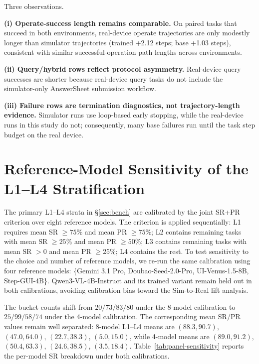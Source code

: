 Three observations.

\textbf{(i) Operate-success length remains comparable.} On paired tasks that succeed in both environments, real-device operate trajectories are only modestly longer than simulator trajectories (trained +2.12 steps; base +1.03 steps), consistent with similar successful-operation path lengths across environments.

\textbf{(ii) Query/hybrid rows reflect protocol asymmetry.} Real-device query successes are shorter because real-device query tasks do not include the simulator-only AnswerSheet submission workflow.

\textbf{(iii) Failure rows are termination diagnostics, not trajectory-length evidence.} Simulator runs use loop-based early stopping, while the real-device runs in this study do not; consequently, many base failures run until the task step budget on the real device.


\section{Reference-Model Sensitivity of the L1--L4 Stratification}\label{app:panel-sensitivity}

The primary L1--L4 strata in §\ref{sec:bench} are calibrated by the joint SR+PR criterion over eight reference models. The criterion is applied sequentially: L1 requires mean SR $\geq75\%$ and mean PR $\geq75\%$; L2 contains remaining tasks with mean SR $\geq25\%$ and mean PR $\geq50\%$; L3 contains remaining tasks with mean SR $>0$ and mean PR $\geq25\%$; L4 contains the rest. To test sensitivity to the choice and number of reference models, we re-run the same calibration using four reference models: \{Gemini 3.1 Pro, Doubao-Seed-2.0-Pro, UI-Venus-1.5-8B, Step-GUI-4B\}. Qwen3-VL-4B-Instruct and its trained variant remain held out in both calibrations, avoiding calibration bias toward the Sim-to-Real lift analysis.

The bucket counts shift from $20/73/83/80$ under the 8-model calibration to $25/99/58/74$ under the 4-model calibration. The corresponding mean SR/PR values remain well separated: 8-model L1--L4 means are $(88.3,90.7)$, $(47.0,64.0)$, $(22.7,38.3)$, $(5.0,15.0)$, while 4-model means are $(89.0,91.2)$, $(50.4,63.3)$, $(24.6,38.5)$, $(3.5,18.4)$. Table~\ref{tab:panel-sensitivity} reports the per-model SR breakdown under both calibrations.

